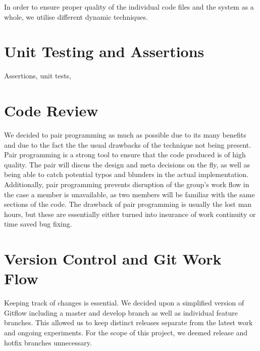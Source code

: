 In order to ensure proper quality of the individual code files and the system as a whole, we utilise different dynamic techniques.

\section{Unit Testing and Assertions}
Assertions, unit tests, 

\section{Code Review}
We decided to pair programming as much as possible due to its many benefits and due to the fact the the usual drawbacks of the technique not being present.
Pair programming is a strong tool to ensure that the code produced is of high quality. The pair will discus the design and meta decisions on the fly, as well as being able to catch potential typos and blunders in the actual implementation. Additionally, pair programming prevents disruption of the group's work flow in the case a member is unavailable, as two members will be familiar with the same sections of the code. The drawback of pair programming is usually the lost man hours, but these are essentially either turned into insurance of work continuity or time saved bug fixing.

\section{Version Control and Git Work Flow}
Keeping track of changes is essential. We decided upon a simplified version of Gitflow including a master and develop branch as well as individual feature branches. This allowed us to keep distinct releases separate from the latest work and ongoing experiments. For the scope of this project, we deemed release and hotfix branches unnecessary.
